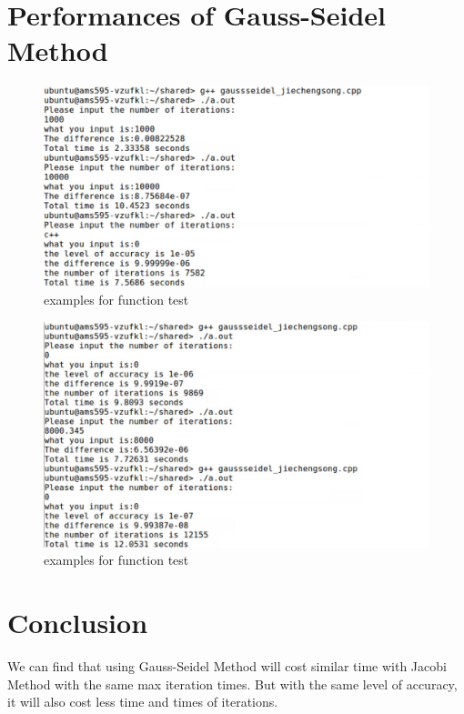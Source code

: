 \documentclass[a4paper, 11pt]{article}
\begin{document}
\section*{Performances of Gauss-Seidel Method}
\begin{figure}[H]
\centering
\includegraphics[width=\textwidth]{gauss1.jpg}
\caption{examples for function test}\label{fig:digit}
\end{figure}
\begin{figure}[H]
\centering
\includegraphics[width=\textwidth]{gauss2.jpg}
\caption{examples for function test}\label{fig:digit}
\end{figure}
\section*{Conclusion}
We can find that using Gauss-Seidel Method will cost similar time with Jacobi Method with the same max iteration times. But with the same level of accuracy, it will also cost less time and times of iterations.
\end{document}
